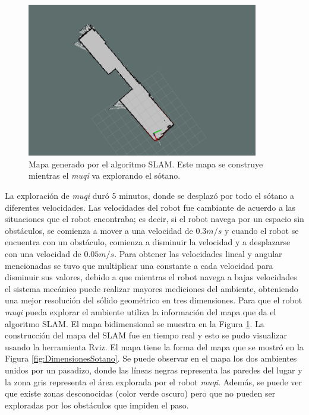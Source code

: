 \begin{figure}
  \centering \footnotesize
  \includegraphics[width=0.90\textwidth]{images/2DSotanoSLAM.png}
  \captionsetup{font=footnotesize}
  \caption{Mapa generado por el algoritmo SLAM. Este mapa se construye mientras el
  \textit{muqi} va explorando el sótano.}
  \label{fig:slamSotano}
\end{figure}

La exploración de \textit{muqi} duró 5 minutos, donde se desplazó por todo el sótano
a diferentes velocidades. Las velocidades del robot fue cambiante de acuerdo 
a las situaciones que el robot encontraba; es decir, si el robot navega por un espacio 
sin obstáculos, se comienza a mover a una velocidad de $0.3 m/s$ y cuando el robot 
se encuentra con un obstáculo, comienza a disminuir la velocidad y a
desplazarse con una velocidad de $0.05 m/s$. Para obtener las velocidades lineal y angular
mencionadas se tuvo que multiplicar una constante a cada velocidad para disminuir 
sus valores, debido a que mientras el robot navega a bajas velocidades el sistema 
mecánico puede realizar mayores mediciones del ambiente, obteniendo una mejor 
resolución del sólido geométrico en tres dimensiones. 
Para que el robot \textit{muqi} pueda explorar el ambiente utiliza la información del mapa 
que da el algoritmo SLAM. El mapa bidimensional se muestra en la Figura \ref{fig:slamSotano}. 
La construcción del mapa del SLAM fue en tiempo real y esto se pudo visualizar usando la 
herramienta Rviz. El mapa tiene la forma del mapa que se mostró en la Figura 
\ref{fig:DimensionesSotano}. Se puede observar en el mapa los dos ambientes unidos por un 
pasadizo, donde las líneas negras representa las paredes del lugar y la zona gris representa 
el área explorada por el robot \textit{muqi}. Además, se puede ver que existe zonas 
desconocidas (color verde oscuro) pero que no pueden ser exploradas por los obstáculos que 
impiden el paso.



